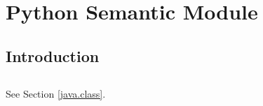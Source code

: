 \chapter{Python Semantic Module}

\section{Introduction}

\section{}

See Section \vref{java.class}.

\section{}
\label{python.condition}

\section{}
\label{python.extractor}

\section{}
\label{python.consequence}

